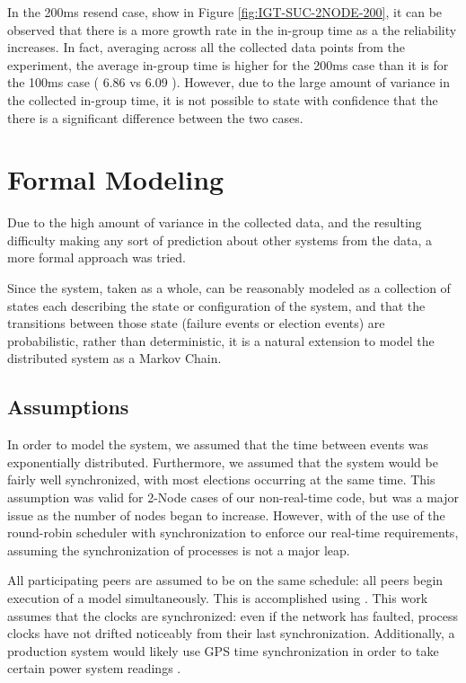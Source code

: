 In the 200ms resend case, show in Figure \ref{fig:IGT-SUC-2NODE-200}, it can be 
observed that there is a more growth rate in the in-group time as a the
reliability increases. In fact, averaging across all the collected data points
from the experiment, the average in-group time is higher for the 200ms case
than it is for the 100ms case ( 6.86 vs 6.09 ). However, due to the large amount
of variance in the collected in-group time, it is not possible to state with
confidence that the there is a significant difference between the two cases.

\section{Formal Modeling}

Due to the high amount of variance in the collected data, and the resulting
difficulty making any sort of prediction about other systems from the data, a
more formal approach was tried.

Since the system, taken as a whole, can be reasonably modeled as a collection of 
states each describing the state or configuration of the system, and that the
transitions between those state (failure events or election events) are probabilistic,
rather than deterministic, it is a natural extension to model the distributed
system as a Markov Chain.

\subsection{Assumptions}
In order to model the system, we assumed that the time between events was 
exponentially distributed. Furthermore, we assumed that the system would be
fairly well synchronized, with most elections occurring at the same time. This
assumption was valid for 2-Node cases of our non-real-time code, but was
a major issue as the number of nodes began to increase. However, with of
the use of the round-robin scheduler with synchronization to enforce our
real-time requirements, assuming the synchronization of processes is not a
major leap.

All participating peers are assumed to be on the same schedule: all
peers begin execution of a model simultaneously. This is accomplished using \cite{DCS}.
This work assumes that the clocks are synchronized: even if the network has faulted,
process clocks have not drifted noticeably from their last synchronization. Additionally,
a production system would likely use GPS time synchronization in order to take
certain power system readings \cite{PHASORREADINGS}.

